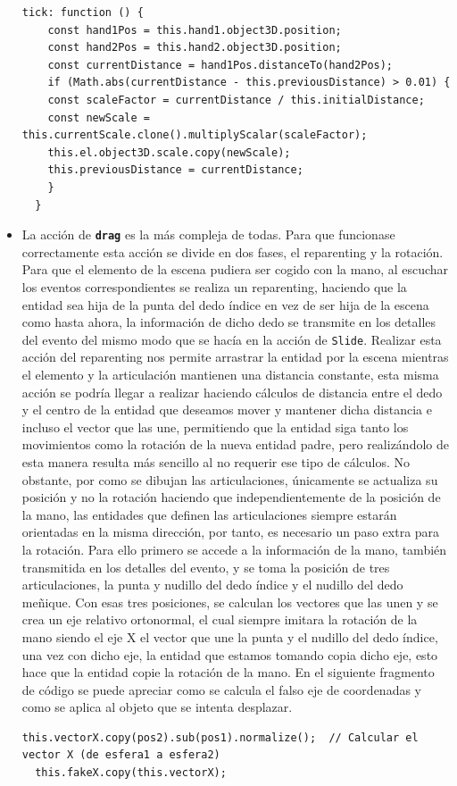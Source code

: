 \documentclass[a4paper, 12pt]{book}
\begin{document}
\begin{itemize}
\begin{lstlisting}[caption=Actualización del factor de escala, captionpos=b, label=lst:stretch]
  tick: function () {  
    const hand1Pos = this.hand1.object3D.position;
    const hand2Pos = this.hand2.object3D.position;
    const currentDistance = hand1Pos.distanceTo(hand2Pos);
    if (Math.abs(currentDistance - this.previousDistance) > 0.01) {
    const scaleFactor = currentDistance / this.initialDistance;
    const newScale = this.currentScale.clone().multiplyScalar(scaleFactor);
    this.el.object3D.scale.copy(newScale);
    this.previousDistance = currentDistance;
    }
  }
\end{lstlisting}

  \item La acción de \textbf{\texttt{drag}} es la más compleja de todas. Para que funcionase correctamente esta acción se divide en dos fases, el reparenting y la rotación. Para que el elemento de la escena pudiera ser cogido con la mano, al escuchar los eventos correspondientes se realiza un reparenting, haciendo que la entidad sea hija de la punta del dedo índice en vez de ser hija de la escena como hasta ahora, la información de dicho dedo se transmite en los detalles del evento del mismo modo que se hacía en la acción de \texttt{Slide}. Realizar esta acción del reparenting nos permite arrastrar la entidad por la escena mientras el elemento y la articulación mantienen una distancia constante, esta misma acción se podría llegar a realizar haciendo cálculos de distancia entre el dedo y el centro de la entidad que deseamos mover y mantener dicha distancia e incluso el vector que las une, permitiendo que la entidad siga tanto los movimientos como la rotación de la nueva entidad padre, pero realizándolo de esta manera resulta más sencillo al no requerir ese tipo de cálculos. No obstante, por como se dibujan las articulaciones, únicamente se actualiza su posición y no la rotación haciendo que independientemente de la posición de la mano, las entidades que definen las articulaciones siempre estarán orientadas en la misma dirección, por tanto, es necesario un paso extra para la rotación.
Para ello primero se accede a la información de la mano, también transmitida en los detalles del evento, y se toma la posición de tres articulaciones, la punta y nudillo del dedo índice y el nudillo del dedo meñique. Con esas tres posiciones, se calculan los vectores que las unen y se crea un eje relativo ortonormal, el cual siempre imitara la rotación de la mano siendo el eje X el vector que une la punta y el nudillo del dedo índice, una vez con dicho eje, la entidad que estamos tomando copia dicho eje, esto hace que la entidad copie la rotación de la mano. En el siguiente fragmento de código se puede apreciar como se calcula el falso eje de coordenadas y como se aplica al objeto que se intenta desplazar.
\begin{lstlisting}[caption=Creación del falso eje de coordenadas, captionpos=b, label=lst:fake_coords]
  this.vectorX.copy(pos2).sub(pos1).normalize();  // Calcular el vector X (de esfera1 a esfera2)
  this.fakeX.copy(this.vectorX);


\end{lstlisting}
\end{itemize}
\end{document}
